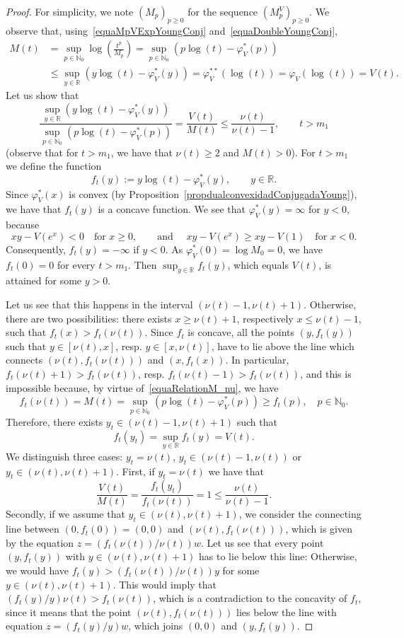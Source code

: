 \documentclass[11pt,a4paper]{article}
\theoremstyle{definition}
\def\fy{\varphi}
\def\oo{\infty}
\def\N{\mathbb{N}}
\def\R{\mathbb{R}}
\def\no{\nonumber}
\begin{document}
\begin{proof}
  For simplicity, we note $(M_p)_{p\geq0}$ for the sequence $(M^V_p)_{p\geq0}$. We observe that, using~\eqref{equaMpVExpYoungConj} and~\eqref{equaDoubleYoungConj},
\begin{align}
M(t)&=\sup_{p\in\N_0} \log \left(\frac{t^p}{M_p}\right)= \sup_{p\in\N_0}  \left(p \log(t) - \fy^*_V(p)  \right) \no\\
  &\leq
  \sup_{y\in\R}\left(y \log(t) - \fy^*_V(y)  \right)= \fy^{**}_V(\log(t))= \fy_V(\log(t))=V(t).\label{desMyV1}
\end{align}
 Let us show that
\begin{equation*}
 \frac{\sup_{y\in\R} \left(y \log(t) - \fy^*_V(y)  \right) }{\sup_{p\in\N_0} \left(p \log(t) - \fy^*_V(p)  \right)}
 =\frac{V(t)}{M(t)} \leq \frac{\nu(t)}{\nu(t)-1}, \qquad  t>m_1
 \end{equation*}
(observe that for $t>m_1$, we have that $\nu(t)\geq2$ and $M(t)>0$). For $t>m_1$ we define the function
 $$f_t(y):= y \log(t)-\fy^*_V(y), \qquad y\in\R.$$
 Since $\fy^*_V(x)$ is convex (by Proposition~\ref{propdualconvexidadConjugadaYoung}),
 we have that $f_t(y)$ is a concave function.
 We see that $\fy^*_V(y)=\oo$ for $y<0$, because
 $$xy-V(e^x)<0\quad\textrm{for }x\geq 0,\qquad \textrm{and }\quad xy-V(e^x)\geq xy-V(1)\quad\textrm{for }x<0.
 $$
 Consequently, $f_t(y)=-\oo$ if $y<0$. As $\fy^*_V(0)=\log M_0=0$, we have $f_t(0)=0$ for every $t>m_1$. Then
 $\sup_{y\in\R}f_t(y)$, which equals $V(t)$, is attained for some $y>0$.

 Let us see that this happens in the interval $(\nu(t)-1,\nu(t)+1)$.
 Otherwise,
 there are two possibilities: there exists $x\geq\nu(t)+1$,  respectively $x\leq\nu(t)-1$, such that $f_t(x)>f_t(\nu(t))$. Since $f_t$ is concave, all the points $(y,f_t(y))$ such that $y\in[\nu(t),x]$, resp. $y\in[x,\nu(t)]$, have to lie above the line which
 connects $(\nu(t), f_t(\nu(t)))$ and $(x,f_t(x))$. In particular, $f_t(\nu(t)+1) > f_t(\nu(t))$,
 resp. $f_t(\nu(t)-1) > f_t(\nu(t))$, and this is impossible because, by virtue of~\eqref{equaRelationM_nu}, we have
 $$f_t(\nu(t))=M(t)=  \sup_{p\in\N_0} \left(p \log(t) - \fy^*_V(p)  \right)\geq f_t(p), \quad p\in\N_0.$$
 Therefore, there exists $y_t\in(\nu(t)-1,\nu(t)+1)$ such that
 $$f_t(y_t)=\sup_{y\in\R} f_t(y)=V(t).$$
 We distinguish three cases: $y_t=\nu(t)$, $y_t\in(\nu(t)-1,\nu(t))$ or $y_t\in(\nu(t),\nu(t)+1)$. First, if $y_t=\nu(t)$ we have that
 $$\frac{V(t)}{M(t)} =\frac{f_t(y_t)}{f_t(\nu(t))} =1 \leq \frac{\nu(t)}{\nu(t)-1}.$$
  Secondly, if we assume that $y_t\in (\nu(t),\nu(t)+1)$, we consider the connecting line between $(0,f_t(0))=(0,0)$ and $(\nu(t),f_t(\nu(t)))$, which is given
 by the equation $z=(f_t(\nu(t))/\nu(t))w$. Let us see that every point $(y,f_t(y))$ with $y\in(\nu(t),\nu(t)+1)$ has to lie below this line: Otherwise, we would have
 $f_t(y)>(f_t(\nu(t))/\nu(t))y$ for some $y\in(\nu(t),\nu(t)+1)$. This would imply that $(f_t(y)/y)\nu(t)>f_t(\nu(t))$, which is a contradiction
 to the concavity of $f_t$, since it means that the point $(\nu(t),f_t(\nu(t)))$ lies below the line with equation $z=(f_t(y)/y)w$, which joins $(0,0)$ and $(y,f_t(y))$.


\end{proof}
\end{document}
